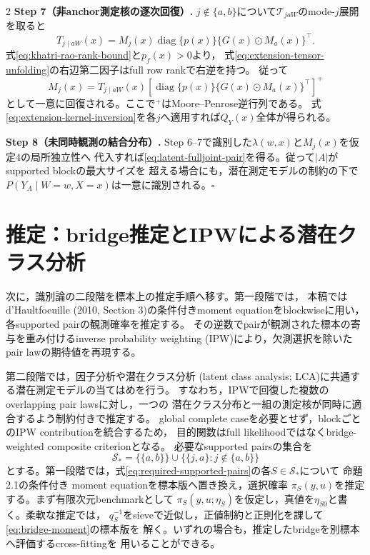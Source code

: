 \documentclass[a4paper,10pt]{article}
\begin{document}
\begin{multicols}{2}
\noindent\textbf{Step 7（非anchor測定核の逐次回復）.}
$j\notin\{a,b\}$について$\mathcal T_{jaW}$のmode-$j$展開を取ると
\begin{equation}
T_{j\mid aW}(x)
=M_j(x)\operatorname{diag}\{p(x)\}
\{G(x)\odot M_a(x)\}^\top.
\label{eq:extension-tensor-unfolding}
\end{equation}
式\eqref{eq:khatri-rao-rank-bound}と$p_f(x)>0$より，
式\eqref{eq:extension-tensor-unfolding}の右辺第二因子はfull row rankで右逆を持つ。
従って
\begin{equation}
M_j(x)=T_{j\mid aW}(x)
\left[\operatorname{diag}\{p(x)\}
\{G(x)\odot M_a(x)\}^\top\right]^+
\label{eq:extension-kernel-inversion}
\end{equation}
として一意に回復される。ここで$^+$はMoore--Penrose逆行列である。
式\eqref{eq:extension-kernel-inversion}を各$j$へ適用すれば$Q_Y(x)$全体が得られる。

\noindent\textbf{Step 8（未同時観測の結合分布）.}
Step 6--7で識別した$\lambda(w,x)$と$M_j(x)$を仮定4の局所独立性へ
代入すれば\eqref{eq:latent-fulljoint-pair}を得る。従って$|A|$が
supported blockの最大サイズを
超える場合にも，潜在測定モデルの制約の下で
$P(Y_A\mid W=w,X=x)$は一意に識別される。\hfill$\square$

\section{推定：bridge推定とIPWによる潜在クラス分析}
次に，識別論の二段階を標本上の推定手順へ移す。第一段階では，
本稿ではd'Haultfoeuille (2010, Section 3)の条件付きmoment equationをblockwiseに用い，
各supported pairの観測確率を推定する。
その逆数でpairが観測された標本の寄与を重み付けるinverse probability weighting
(IPW)により，欠測選択を除いたpair lawの期待値を再現する。

第二段階では，因子分析や潜在クラス分析
(latent class analysis; LCA)に共通する潜在測定モデルの当てはめを行う。
すなわち，IPWで回復した複数のoverlapping pair lawsに対し，一つの
潜在クラス分布と一組の測定核が同時に適合するよう制約付きで推定する。
global complete caseを必要とせず，blockごとのIPW contributionを統合するため，
目的関数はfull likelihoodではなくbridge-weighted composite criterionとなる。
必要なsupported pairsの集合を
\begin{equation}
\mathcal S_*=\{\{a,b\}\}\cup
\{\{j,a\}:j\notin\{a,b\}\}
\label{eq:required-supported-pairs}
\end{equation}
とする。第一段階では，式\eqref{eq:required-supported-pairs}の各$S\in\mathcal S_*$について
命題2.1の条件付き
moment equationを標本版へ置き換え，選択確率
$\pi_S(y,u)$を推定する。まず有限次元benchmarkとして
$\pi_S(y,u;\eta_S)$を仮定し，真値を$\eta_{S0}$と書く。柔軟な推定では，
$q_S^{-1}$をsieveで近似し，正値制約と正則化を課して\eqref{eq:bridge-moment}の標本版を
解く。いずれの場合も，推定したbridgeを別標本へ評価するcross-fittingを
用いることができる。


\end{multicols}
\end{document}
